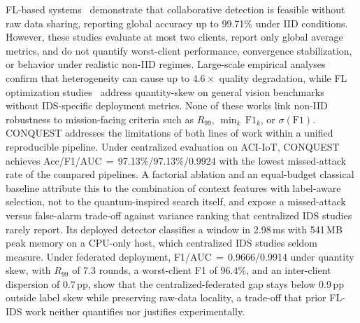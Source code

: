 \documentclass[conference]{IEEEtran}
\begin{document}
FL-based systems~\cite{FRIHA202217,herlambangfederated}
demonstrate that collaborative detection is feasible
without raw data sharing, reporting global accuracy up to
99.71\% under IID conditions. However, these studies evaluate
at most two clients, report only global average metrics, and
do not quantify worst-client performance, convergence
stabilization, or behavior under realistic non-IID regimes.
Large-scale empirical analyses~\cite{abdelmoniemcomprehensive}
confirm that heterogeneity can cause up to $4.6\times$ quality
degradation, while FL optimization
studies~\cite{gefedamkd} address quantity-skew on general
vision benchmarks without IDS-specific deployment metrics.
None of these works link non-IID robustness to
mission-facing criteria such as $R_{99}$,
$\min_k\,\mathrm{F1}_k$, or $\sigma(\mathrm{F1})$.
CONQUEST addresses the limitations of both lines of work
within a unified reproducible pipeline. Under centralized
evaluation on ACI-IoT, CONQUEST achieves
Acc/F1/AUC\,$=$\,97.13\%/97.13\%/0.9924 with the lowest
missed-attack rate of the compared pipelines. A factorial
ablation and an equal-budget classical baseline attribute this to
the combination of context features with label-aware selection,
not to the quantum-inspired search itself, and expose a
missed-attack versus false-alarm trade-off against variance
ranking that centralized IDS studies rarely report.
Its deployed detector classifies a window in
2.98\,ms with 541\,MB peak memory on a CPU-only host, which
centralized IDS studies seldom measure.
Under federated deployment,
F1/AUC\,$=$\,0.9666/0.9914 under quantity skew, with
$R_{99}$ of 7.3 rounds, a worst-client F1 of $96.4\%$, and an
inter-client dispersion of $0.7$\,pp, show that the
centralized-federated gap stays below 0.9\,pp outside label skew
while preserving raw-data locality, a trade-off that
prior FL-IDS work neither quantifies nor justifies
experimentally.
\end{document}
